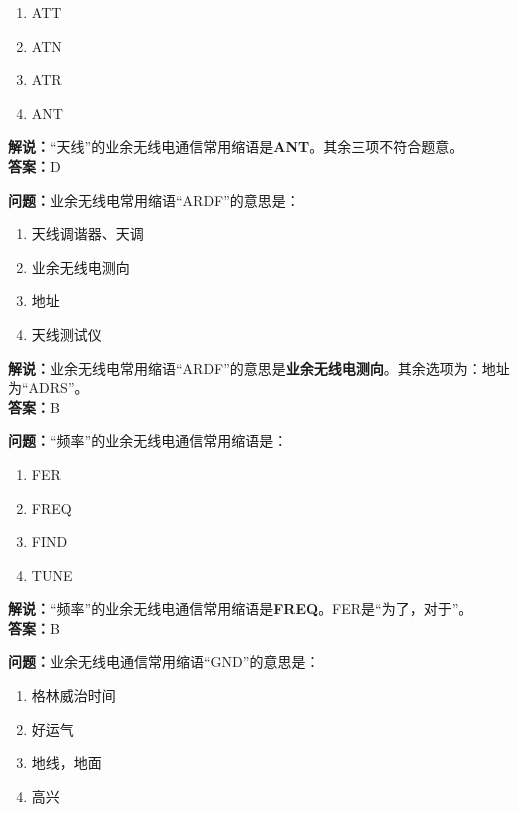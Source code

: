 \documentclass{ctexbook}
\begin{document}
\begin{enumerate}[label=\Alph*), leftmargin=3em]
	\item ATT
	\item ATN
	\item ATR
	\item ANT
\end{enumerate}

\noindent\textbf{解说：}“天线”的业余无线电通信常用缩语是\textbf{ANT}。其余三项不符合题意。\\\noindent\textbf{答案：}D


\bigskip


\noindent\textbf{问题：}业余无线电常用缩语“ARDF”的意思是：

\begin{enumerate}[label=\Alph*), leftmargin=3em]
	\item 天线调谐器、天调
	\item 业余无线电测向
	\item 地址
	\item 天线测试仪
\end{enumerate}

\noindent\textbf{解说：}业余无线电常用缩语“ARDF”的意思是\textbf{业余无线电测向}。其余选项为：地址为“ADRS”。\\\noindent\textbf{答案：}B


\bigskip


\noindent\textbf{问题：}“频率”的业余无线电通信常用缩语是：
\begin{enumerate}[label=\Alph*), leftmargin=3em]
	\item FER
	\item FREQ
	\item FIND
	\item TUNE
\end{enumerate}

\noindent\textbf{解说：}“频率”的业余无线电通信常用缩语是\textbf{FREQ}。FER是“为了，对于”。\\\noindent\textbf{答案：}B

\bigskip


\noindent\textbf{问题：}业余无线电通信常用缩语“GND”的意思是：

\begin{enumerate}[label=\Alph*), leftmargin=3em]
	\item 格林威治时间
	\item 好运气
	\item 地线，地面
	\item 高兴
\end{enumerate}
\end{document}
